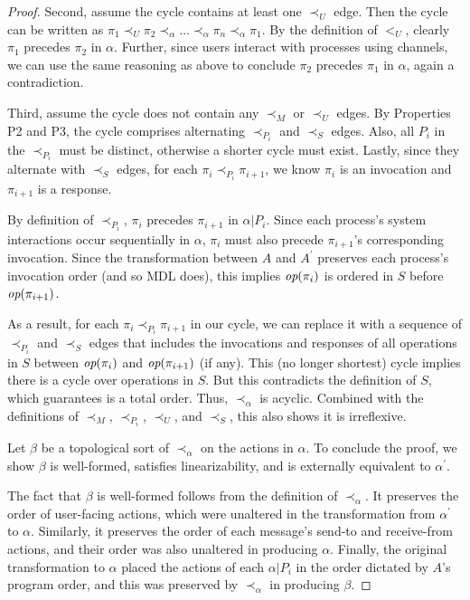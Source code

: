 \begin{proof}
Second, assume the cycle contains at least one $\prec_U$ edge. Then the cycle can be
written as
$\pi_1 \prec_U \pi_2 \prec_{\alpha} \ldots \prec_{\alpha} \pi_n \prec_{\alpha} \pi_1$. By the definition of $<_U$, clearly $\pi_1$ precedes $\pi_2$ in $\alpha$.
Further, since users interact with processes using channels, we can use the same
reasoning as above to conclude $\pi_2$ precedes $\pi_1$ in $\alpha$, again a
contradiction. 

Third, assume the cycle does not contain any $\prec_M$ or $\prec_U$ edges.
By Properties P2 and P3, the cycle comprises alternating
$\prec_{P_i}$ and $\prec_S$ edges. Also, all $P_i$ in the $\prec_{P_i}$
must be distinct, otherwise a shorter cycle must exist.
Lastly, since they alternate with $\prec_S$ edges,
for each $\pi_i \prec_{P_i} \pi_{i+1}$, we know 
$\pi_i$ is an invocation and $\pi_{i+1}$ is a response.

By definition of $\prec_{P_i}$, $\pi_i$ precedes $\pi_{i+1}$ in $\alpha | P_i$.
Since each process’s system interactions occur sequentially in $\alpha$,
$\pi_{i}$ must also precede $\pi_{i+1}$'s corresponding invocation.
Since the transformation between $A$ and $A^\prime$ preserves each process’s
invocation order (and so MDL does), this implies $\operatorname*{\textit{op}}(\pi_{i})$ is ordered in $S$
before $\operatorname*{\textit{op}}(\pi_{i+1})$.

As a result, for each $\pi_i \prec_{P_i} \pi_{i+1}$ in our cycle, we can replace it
with a sequence of $\prec_{P_i}$ and $\prec_S$ edges that includes the invocations 
and responses of all operations in $S$ between $\operatorname*{\textit{op}}(\pi_i)$ and $\operatorname*{\textit{op}}(\pi_{i+1})$
(if any). This (no longer shortest) cycle implies there is a cycle over operations 
in $S$. But this contradicts the definition of $S$, which \MDL{} guarantees is a 
total order. Thus, $\prec_{\alpha}$ is acyclic. Combined with the
definitions of $\prec_M$, $\prec_{P_i}$, $\prec_U$, and $\prec_S$, this also
shows it is irreflexive.

Let $\beta$ be a topological sort of $\prec_{\alpha}$ on the actions in
$\alpha$. To conclude the proof, we show $\beta$ is well-formed,
satisfies linearizability, and is externally equivalent to $\alpha^\prime$.

The fact that $\beta$ is well-formed follows from the definition of
$\prec_{\alpha}$. It preserves the order of user-facing actions,
which were unaltered in the transformation from $\alpha^\prime$ to $\alpha$.
Similarly, it preserves the order of each message's send-to and receive-from actions,
and their order was also unaltered in producing $\alpha$. Finally, the original
transformation to $\alpha$ placed the actions of each $\alpha | P_i$ in
the order dictated by $A$'s program order, and this was preserved by
$\prec_{\alpha}$ in producing $\beta$.


\end{proof}
